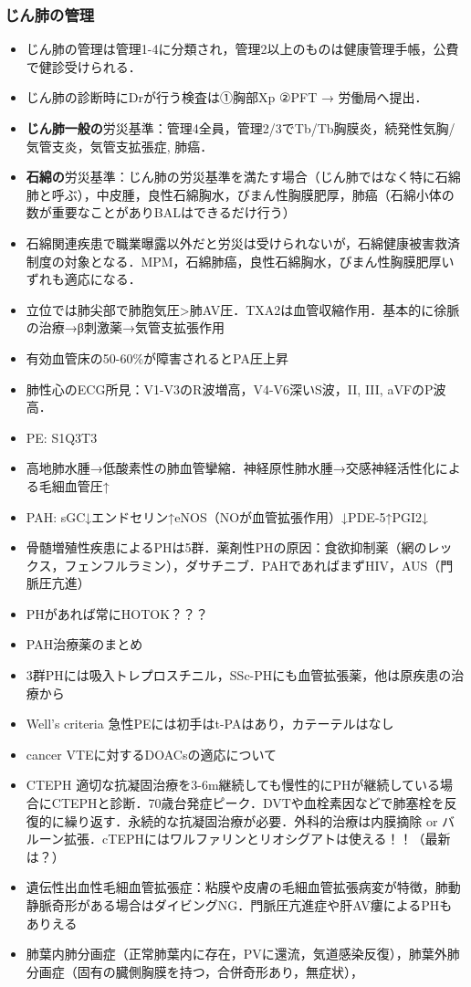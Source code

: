 \subsubsection{じん肺の管理}
\begin{itemize}
\item じん肺の管理は管理1-4に分類され，管理2以上のものは健康管理手帳，公費で健診受けられる．
\item じん肺の診断時にDrが行う検査は①胸部Xp ②PFT → 労働局へ提出．
\item \textbf{じん肺一般の}労災基準：管理4全員，管理2/3でTb/Tb胸膜炎，続発性気胸/気管支炎，気管支拡張症, 肺癌．

\item \textbf{石綿の}労災基準：じん肺の労災基準を満たす場合（じん肺ではなく特に石綿肺と呼ぶ），中皮腫，良性石綿胸水，びまん性胸膜肥厚，肺癌（石綿小体の数が重要なことがありBALはできるだけ行う）

\item 石綿関連疾患で職業曝露以外だと労災は受けられないが，石綿健康被害救済制度の対象となる．MPM，石綿肺癌，良性石綿胸水，びまん性胸膜肥厚いずれも適応になる．

\item 立位では肺尖部で肺胞気圧>肺AV圧．TXA2は血管収縮作用．基本的に徐脈の治療→β刺激薬→気管支拡張作用
\item 有効血管床の50-60\%が障害されるとPA圧上昇
\item 肺性心のECG所見：V1-V3のR波増高，V4-V6深いS波，II, III, aVFのP波高．
\item PE: S1Q3T3
\item 高地肺水腫→低酸素性の肺血管攣縮．神経原性肺水腫→交感神経活性化による毛細血管圧↑
\item PAH: sGC↓エンドセリン↑eNOS（NOが血管拡張作用）↓PDE-5↑PGI2↓
\item 骨髄増殖性疾患によるPHは5群．薬剤性PHの原因：食欲抑制薬（網のレックス，フェンフルラミン），ダサチニブ．PAHであればまずHIV，AUS（門脈圧亢進）
\item PHがあれば常にHOTOK？？？
\item PAH治療薬のまとめ
\item 3群PHには吸入トレプロスチニル，SSc-PHにも血管拡張薬，他は原疾患の治療から
\item Well's criteria 急性PEには初手はt-PAはあり，カテーテルはなし
\item cancer VTEに対するDOACsの適応について
\item CTEPH 適切な抗凝固治療を3-6m継続しても慢性的にPHが継続している場合にCTEPHと診断．70歳台発症ピーク．DVTや血栓素因などで肺塞栓を反復的に繰り返す．永続的な抗凝固治療が必要．外科的治療は内膜摘除 or バルーン拡張．cTEPHにはワルファリンとリオシグアトは使える！！（最新は？）
\item 遺伝性出血性毛細血管拡張症：粘膜や皮膚の毛細血管拡張病変が特徴，肺動静脈奇形がある場合はダイビングNG．門脈圧亢進症や肝AV瘻によるPHもありえる
\item 肺葉内肺分画症（正常肺葉内に存在，PVに還流，気道感染反復），肺葉外肺分画症（固有の臓側胸膜を持つ，合併奇形あり，無症状），


\end{itemize}
